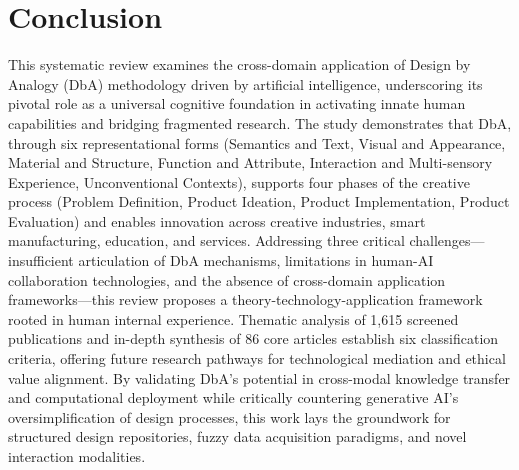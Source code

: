 \section{Conclusion}
This systematic review examines the cross-domain application of Design by Analogy (DbA) methodology driven by artificial intelligence, underscoring its pivotal role as a universal cognitive foundation in activating innate human capabilities and bridging fragmented research. The study demonstrates that DbA, through six representational forms (Semantics and Text, Visual and Appearance, Material and Structure, Function and Attribute, Interaction and Multi-sensory Experience, Unconventional Contexts), supports four phases of the creative process (Problem Definition, Product Ideation, Product Implementation, Product Evaluation) and enables innovation across creative industries, smart manufacturing, education, and services. Addressing three critical challenges—insufficient articulation of DbA mechanisms, limitations in human-AI collaboration technologies, and the absence of cross-domain application frameworks—this review proposes a theory-technology-application framework rooted in human internal experience. Thematic analysis of 1,615 screened publications and in-depth synthesis of 86 core articles establish six classification criteria, offering future research pathways for technological mediation and ethical value alignment. By validating DbA’s potential in cross-modal knowledge transfer and computational deployment while critically countering generative AI’s oversimplification of design processes, this work lays the groundwork for structured design repositories, fuzzy data acquisition paradigms, and novel interaction modalities.
